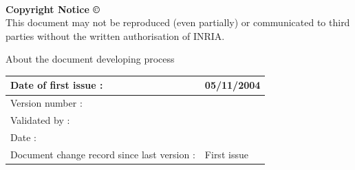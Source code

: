\textsf{ }\\
\begin{center}
\textbf{Copyright Notice \copyright}\\
This document may not be reproduced (even partially) or communicated to third parties without the written authorisation of INRIA.
\end{center}

\pagebreak
\begin{center}
  \textsf{\Large About the document developing process}
\end{center}
\begin{tabular}{|p{}|p{}|}
\hline
Date of first issue : &\textsf{05/11/2004}\\
\hline \hline
Version number : &\textsf{}\\ 
Validated by :& \textsf{}\\
Date : & \textsf{} \\
Document change record since last version : &\textsf{First issue} \\
\hline
\end{tabular}

%


